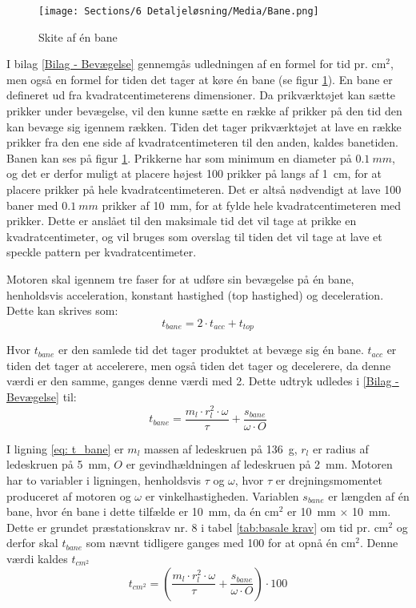 \begin{figure}[H]
    \centering
    \texttt{[image: Sections/6 Detaljeløsning/Media/Bane.png]}
    \caption{Skite af én bane}
    \label{fig: Skite bane}
\end{figure}

I bilag \ref{Bilag - Bevægelse} gennemgås udledningen af en formel for tid pr. cm\(^2\), men også en formel for tiden det tager at køre én bane (se figur \ref{fig: Skite bane}).
En bane er defineret ud fra kvadratcentimeterens dimensioner. Da prikværktøjet kan sætte prikker under bevægelse, vil den kunne sætte en række af prikker på den tid den kan bevæge sig igennem rækken. Tiden det tager prikværktøjet at lave en række prikker fra den ene side af kvadratcentimeteren til den anden, kaldes banetiden. Banen kan ses på figur \ref{fig: Skite bane}. Prikkerne har som minimum en diameter på $\SI{0,1}{mm}$, og det er derfor muligt at placere højest 100 prikker på langs af \SI{1}{cm}, for at placere prikker på hele kvadratcentimeteren. Det er altså nødvendigt at lave 100 baner med $\SI{0,1}{mm}$ prikker af \SI{10}{mm}, for at fylde hele kvadratcentimeteren med prikker. Dette er anslået til den maksimale tid det vil tage at prikke en kvadratcentimeter, og vil bruges som overslag til tiden det vil tage at lave et speckle pattern per kvadratcentimeter.

Motoren skal igennem tre faser for at udføre sin bevægelse på én bane, henholdsvis acceleration, konstant hastighed (top hastighed) og deceleration. Dette kan skrives som:
\begin{equation}
    t_{bane}=2\cdot t_{acc}+t_{top}
\end{equation}

Hvor \(t_{bane}\) er den samlede tid det tager produktet at bevæge sig én bane. \(t_{acc}\) er tiden det tager at accelerere, men også tiden det tager og decelerere, da denne værdi er den samme, ganges denne værdi med 2. Dette udtryk udledes i \ref{Bilag - Bevægelse} til:
\begin{equation}
    t_{bane}=\dfrac{m_{l}\cdot r_{l}^2\cdot \omega}{\tau}+\dfrac{s_{bane}}{\omega\cdot O}
    \label{eq: t_bane}
\end{equation}

I ligning \ref{eq: t_bane} er \(m_{l}\) massen af ledeskruen på \SI{136}{g}, \(r_{l}\) er radius af ledeskruen på \SI{5}{mm}, \(O\) er gevindhældningen af ledeskruen på \SI{2}{mm}. Motoren har to variabler i ligningen, henholdsvis \(\tau\) og \(\omega\), hvor \(\tau\) er drejningsmomentet produceret af motoren og \(\omega\) er vinkelhastigheden. Variablen \(s_{bane}\) er længden af én bane, hvor én bane i dette tilfælde er \SI{10}{mm}, da én cm\(^2\) er \SI{10}{mm} \(\times\) \SI{10}{mm}. Dette er grundet præstationskrav nr. 8 i tabel \ref{tab:basale krav} om tid pr. cm\(^2\) og derfor skal \(t_{bane}\) som nævnt tidligere ganges med 100 for at opnå én cm\(^2\). Denne værdi  kaldes \(t_{cm^2}\)
 \begin{equation}
      t_{cm^2}=\left(\dfrac{m_{l}\cdot r_{l}^2\cdot \omega}{\tau}+\dfrac{s_{bane}}{\omega\cdot O}\right) \cdot 100
      \label{eq:tcm2}
 \end{equation}

